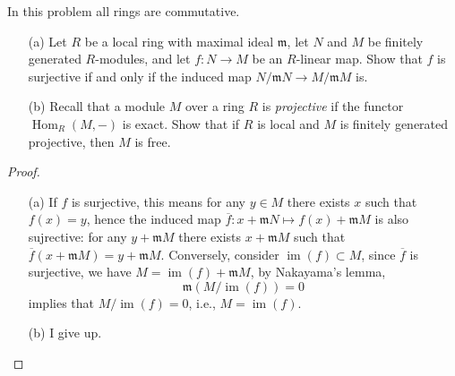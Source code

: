 \documentclass[openany]{book}
\DeclareMathOperator{\im}{im}
\begin{document}
\begin{prob}
    In this problem all rings are commutative.
    \begin{itemize}
        \item[(a)] Let \(R\) be a local ring with maximal ideal \(\mathfrak{m}\), let \(N\) and \(M\) be finitely generated \(R\)-modules, and let \(f\colon N\to M\) be an \(R\)-linear map. Show that \(f\) is surjective if and only if the induced map \(N/\mathfrak{m}N\to M/\mathfrak{m}M\) is.
        \item[(b)] Recall that a module \(M\) over a ring \(R\) is \textit{projective} if the functor \(\operatorname{Hom}_{R}(M,-)\) is exact. Show that if \(R\) is local and \(M\) is finitely generated projective, then \(M\) is free.
    \end{itemize}
\end{prob}
\begin{proof}
    \begin{itemize}
        \item[(a)] If $f$ is surjective, this means for any $y\in M$ there exists $x$ such that $f(x)=y$, hence the induced map $\overline{f}: x+\mathfrak{m}N\mapsto f(x)+\mathfrak{m}M$ is also sujrective: for any $y+\mathfrak{m}M$ there exists $x+\mathfrak{m}M$ such that $\overline{f}(x+\mathfrak{m}M)=y+\mathfrak{m}M$. Conversely, consider $\im(f)\subset M$, since $\overline{f}$ is surjective, we have $M=\im(f)+\mathfrak{m}M$, by Nakayama's lemma, 
        \begin{equation*}
            \mathfrak{m}(M/\im(f))=0
        \end{equation*}
        implies that $M/\im(f)=0$, i.e., $M=\im(f)$.
        
        
        
        
        \item[(b)] I give up.
    \end{itemize}
\end{proof}
\end{document}

